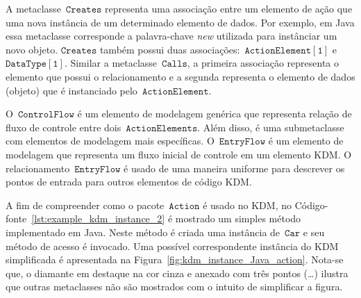 A metaclasse~$\mathtt{Creates}$ representa uma associação entre um elemento de ação que  uma nova instância de um determinado elemento de dados. Por exemplo, em Java essa metaclasse corresponde a palavra-chave \textit{new} utilizada para instânciar um novo objeto. $\mathtt{Creates}$ também possui duas associações:~$\mathtt{ActionElement[1]}$ e~$\mathtt{DataType[1]}$. Similar a metaclasse~$\mathtt{Calls}$, a primeira associação representa o elemento que possui o relacionamento e a segunda representa o elemento de dados (objeto) que é instanciado pelo~$\mathtt{ActionElement}$.


O~$\mathtt{ControlFlow}$ é um elemento de modelagem genérica que representa relação de fluxo de controle entre dois~$\mathtt{ActionElements}$. Além disso, é uma submetaclasse com elementos de modelagem mais específicas. O~$\mathtt{EntryFlow}$ é um elemento de modelagem que representa um fluxo inicial de controle em um elemento KDM. O relacionamento~$\mathtt{EntryFlow}$ é usado de uma maneira uniforme para descrever os pontos de entrada para outros elementos de código KDM.


A fim de compreender como o pacote~$\mathtt{Action}$ é usado no KDM, no Código-fonte~\ref{lst:example_kdm_instance_2} é mostrado um simples método implementado em Java. Neste método é criada uma instância de~$\mathtt{Car}$ e seu método de acesso é invocado. Uma possível correspondente instância do KDM simplificada é apresentada na Figura~\ref{fig:kdm_instance_Java_action}. Nota-se que, o diamante em destaque na cor cinza e anexado com três pontos (\ldots) ilustra que outras metaclasses não são mostrados com o intuito de simplificar a figura.

